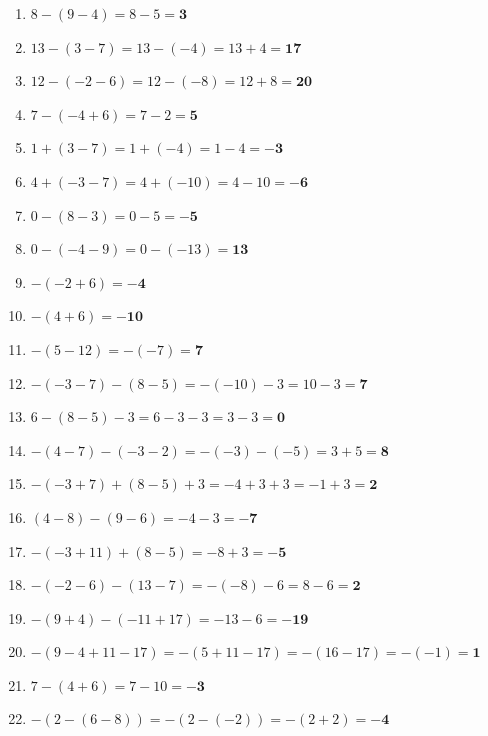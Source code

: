 \documentclass[a4paper,12pt]{article} %
\begin{document}
\begin{enumerate}

  \item \(8 - (9 - 4) = 8 - 5 = \mathbf{3}\) %

  \item \(13 - (3 - 7) = 13 - (-4) = 13 + 4 = \mathbf{17}\) %

  \item \(12 - (-2 - 6) = 12 - (-8) = 12 + 8 = \mathbf{20}\) %

  \item \(7 - (-4 + 6) = 7 - 2 = \mathbf{5}\) %

  \item \(1 + (3 - 7) = 1 + (-4) = 1 - 4 = \mathbf{-3}\) %

  \item \(4 + (-3 - 7) = 4 + (-10) = 4 - 10 = \mathbf{-6}\) %

  \item \(0 - (8 - 3) = 0 - 5 = \mathbf{-5}\) %

  \item \(0 - (-4 - 9) = 0 - (-13) = \mathbf{13}\) %

  \item \(-(-2 + 6) = \mathbf{-4}\) %

  \item \(-(4 + 6) = \mathbf{-10}\) %

  \item \(-(5 - 12) = -(-7) = \mathbf{7}\) %

  \item \(-(-3 - 7) - (8 - 5) = -(-10) - 3 = 10 - 3 = \mathbf{7}\) %

  \item \(6 - (8 - 5) - 3 = 6 - 3 - 3 = 3 - 3 = \mathbf{0}\) %

  \item \(-(4 - 7) - (-3 - 2) = -(-3) - (-5) = 3 + 5 = \mathbf{8}\) %

  \item \(-(-3 + 7) + (8 - 5) + 3 = -4 + 3 + 3 = -1 + 3 = \mathbf{2}\) %

  \item \((4 - 8) - (9 - 6) = -4 - 3 = \mathbf{-7}\) %

  \item \(-(-3 + 11) + (8 - 5) = -8 + 3 = \mathbf{-5}\) %

  \item \(-(-2 - 6) - (13 - 7) = -(-8) - 6 = 8 - 6 = \mathbf{2}\) %

  \item \(-(9 + 4) - (-11 + 17) = -13 - 6 = \mathbf{-19}\) %

  \item \(-(9 - 4 + 11 - 17) = -(5 + 11 - 17) = -(16 - 17) = -(-1) = \mathbf{1}\) %

  \item \(7 - (4 + 6) = 7 - 10 = \mathbf{-3}\) %

  \item \(-(2 - (6 - 8)) = -(2 - (-2)) = -(2 + 2) = \mathbf{-4}\) %

\end{enumerate}
\end{document}
